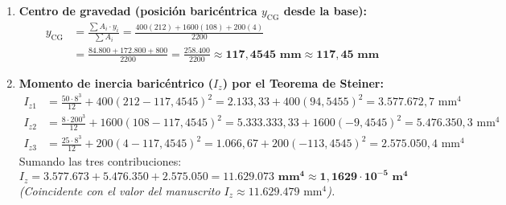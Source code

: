 \begin{enumerate}
    \item \textbf{Centro de gravedad (posición baricéntrica $y_{\text{CG}}$ desde la base):}
          \begin{align}
              y_{\text{CG}} & = \frac{\sum A_i \cdot y_i}{\sum A_i} = \frac{400(212) + 1600(108) + 200(4)}{2200} \nonumber \\
                            & = \frac{84.800 + 172.800 + 800}{2200} = \frac{258.400}{2200} \approx \mathbf{117{,}4545\text{ mm} \approx 117{,}45\text{ mm}}
          \end{align}
    \item \textbf{Momento de inercia baricéntrico ($I_z$) por el Teorema de Steiner:}
          \begin{align}
              I_{z1} & = \frac{50 \cdot 8^3}{12} + 400(212 - 117{,}4545)^2 = 2.133{,}33 + 400(94{,}5455)^2 = 3.577.672{,}7\text{ mm}^4 \\[4pt]
              I_{z2} & = \frac{8 \cdot 200^3}{12} + 1600(108 - 117{,}4545)^2 = 5.333.333{,}33 + 1600(-9{,}4545)^2 = 5.476.350{,}3\text{ mm}^4 \\[4pt]
              I_{z3} & = \frac{25 \cdot 8^3}{12} + 200(4 - 117{,}4545)^2 = 1.066{,}67 + 200(-113{,}4545)^2 = 2.575.050{,}4\text{ mm}^4
          \end{align}
          Sumando las tres contribuciones:
          \begin{equation}
              \boxed{I_z = 3.577.673 + 5.476.350 + 2.575.050 = \mathbf{11.629.073\text{ mm}^4 \approx 1{,}1629 \cdot 10^{-5}\text{ m}^4}}
          \end{equation}
          \textit{(Coincidente con el valor del manuscrito $I_z \approx 11.629.479\text{ mm}^4$).}
\end{enumerate}

